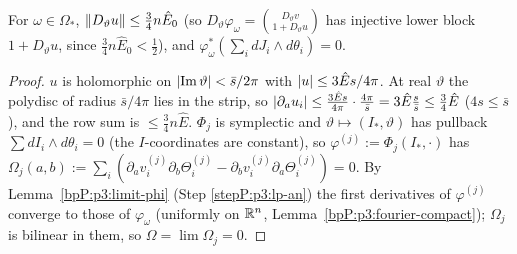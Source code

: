 \begin{lemma}\label{bpP:p3:lagr}
For $\omega\in\Omega_*$, $\lVert D_\vartheta u\rVert\le\frac34n\hat E_0$ (so $D_\vartheta\varphi_\omega=\binom{D_\vartheta v}{1+D_\vartheta u}$ has injective lower block $1+D_\vartheta u$, since $\frac34n\hat E_0<\frac12$), and $\varphi_\omega^*(\sum_idJ_i\wedge d\theta_i)=0$.
\end{lemma}
\begin{proof}
\label{stepP:p3:lg-cauchy}
$u$ is holomorphic on $\lvert \operatorname{Im}\vartheta\rvert<\bar s/2\pi$ with $\lvert u\rvert\le3\hat Es/4\pi$. At real $\vartheta$ the polydisc of radius $\bar s/4\pi$ lies in the strip, so $\lvert \partial_au_i\rvert\le\frac{3\hat Es}{4\pi}\cdot\frac{4\pi}{\bar s}=3\hat E\frac s{\bar s}\le\frac34\hat E$ ($4s\le\bar s$), and the row sum is $\le\frac34n\hat E$.
\label{stepP:p3:lg-j}
$\Phi_j$ is symplectic and $\vartheta\mapsto(I_*,\vartheta)$ has pullback $\sum dI_i\wedge d\theta_i=0$ (the $I$-coordinates are constant), so $\varphi^{(j)}:=\Phi_j(I_*,\cdot)$ has $\Omega_j(a,b):=\sum_i(\partial_av^{(j)}_i\partial_b\Theta^{(j)}_i-\partial_bv_i^{(j)}\partial_a\Theta_i^{(j)})=0$.
\label{stepP:p3:lg-lim}
By Lemma~\ref{bpP:p3:limit-phi} (Step \ref{stepP:p3:lp-an}) the first derivatives of $\varphi^{(j)}$ converge to those of $\varphi_\omega$ (uniformly on $\mathbb{R}^n$, Lemma~\ref{bpP:p3:fourier-compact}); $\Omega_j$ is bilinear in them, so $\Omega=\lim\Omega_j=0$.
\end{proof}

